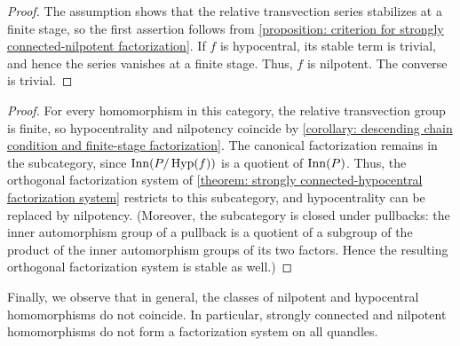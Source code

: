 \begin{proof}
The assumption shows that the relative transvection series stabilizes at a finite stage, so the first assertion follows from \cref{proposition: criterion for strongly connected-nilpotent factorization}. If $f$ is hypocentral, its stable term is trivial, and hence the series vanishes at a finite stage. Thus, $f$ is nilpotent. The converse is trivial.
\end{proof}


\begin{proof}
For every homomorphism in this category, the relative transvection group is finite, so hypocentrality and nilpotency coincide by \cref{corollary: descending chain condition and finite-stage factorization}. The canonical factorization remains in the subcategory, since $\operatorname{Inn}(P/\operatorname{Hyp}(f))$ is a quotient of $\operatorname{Inn}(P)$. Thus, the orthogonal factorization system of \cref{theorem: strongly connected-hypocentral factorization system} restricts to this subcategory, and hypocentrality can be replaced by nilpotency.
(Moreover, the subcategory is closed under pullbacks: the inner automorphism group of a pullback is a quotient of a subgroup of the product of the inner automorphism groups of its two factors. Hence the resulting orthogonal factorization system is stable as well.)
\end{proof}

Finally, we observe that in general, the classes of nilpotent and hypocentral homomorphisms do not coincide. In particular, strongly connected and nilpotent homomorphisms do not form a factorization system on all quandles.


